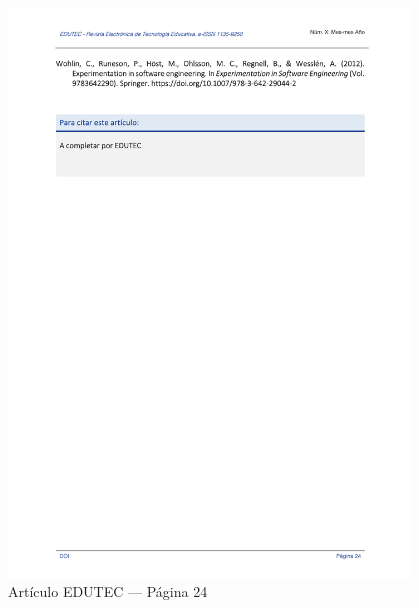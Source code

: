 \begin{figure}[H]
    \centering
    \begin{tcolorbox}[
        colback=white,
        colframe=gray!50,
        boxrule=1pt,
        arc=2pt,
        boxsep=5pt,
        left=3pt,
        right=3pt,
        top=3pt,
        bottom=3pt,
        drop shadow
    ]
        \includegraphics[width=0.95\textwidth,keepaspectratio]{apendices/EDUTEC/24.png}
    \end{tcolorbox}
    \caption{Artículo EDUTEC --- Página 24}\label{fig:edutec-pagina-24}
\end{figure}
\FloatBarrier
